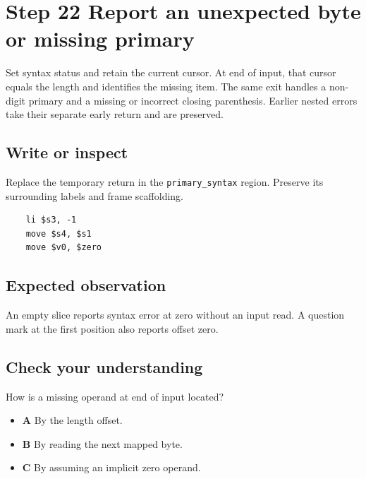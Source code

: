 \section{Step 22 Report an unexpected byte or missing primary}\label{expression-s22}

Set syntax status and retain the current cursor. At end of input, that cursor equals the length and identifies the missing item. The same exit handles a non-digit primary and a missing or incorrect closing parenthesis. Earlier nested errors take their separate early return and are preserved.

\subsection{Write or inspect}
Replace the temporary return in the \texttt{primary\_syntax} region. Preserve its surrounding labels and frame scaffolding.

\begin{verbatim}
    li $s3, -1
    move $s4, $s1
    move $v0, $zero
\end{verbatim}
\subsection{Expected observation}
An empty slice reports syntax error at zero without an input read. A question mark at the first position also reports offset zero.

\subsection{Check your understanding}
How is a missing operand at end of input located?

\begin{itemize}
  \item \textbf{A} By the length offset.
  \item \textbf{B} By reading the next mapped byte.
  \item \textbf{C} By assuming an implicit zero operand.
\end{itemize}

